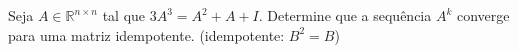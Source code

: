 Seja \(A\in\mathbb{R}^{n\times n}\) tal que \(3A^3=A^2+A+I\). Determine que a sequência \(A^k\) converge para uma matriz idempotente. (idempotente: \(B^2=B\))
